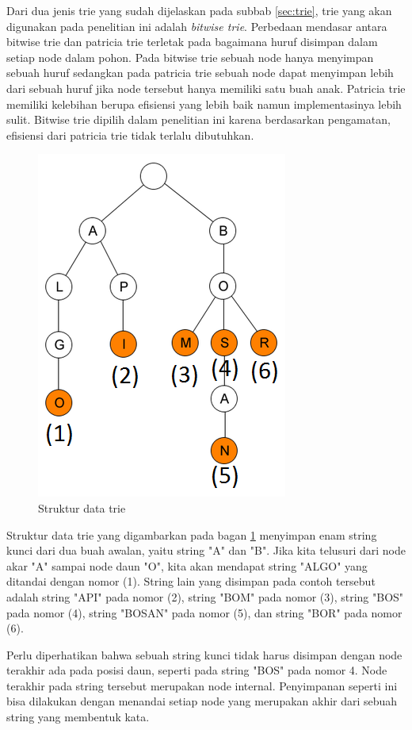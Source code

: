 Dari dua jenis trie yang sudah dijelaskan pada subbab \ref{sec:trie}, trie yang akan digunakan pada penelitian ini adalah \textit{bitwise trie}. Perbedaan mendasar antara bitwise trie dan patricia trie terletak pada bagaimana huruf disimpan dalam setiap node dalam pohon. Pada bitwise trie sebuah node hanya menyimpan sebuah huruf sedangkan pada patricia trie sebuah node dapat menyimpan lebih dari sebuah huruf jika node tersebut hanya memiliki satu buah anak. Patricia trie memiliki kelebihan berupa efisiensi yang lebih baik namun implementasinya lebih sulit. Bitwise trie dipilih dalam penelitian ini karena berdasarkan pengamatan, efisiensi dari patricia trie tidak terlalu dibutuhkan.

\begin{figure}[H]
\centering
\includegraphics[scale=0.75]{Gambar/gambar-trie}
\caption[Struktur data trie]{Struktur data trie} 
\label{bagan-trie}
\end{figure}

Struktur data trie yang digambarkan pada bagan \ref{bagan-trie} menyimpan enam string kunci dari dua buah awalan, yaitu string "A" dan "B". Jika kita telusuri dari node akar "A" sampai node daun "O", kita akan mendapat string "ALGO" yang ditandai dengan nomor (1). String lain yang disimpan pada contoh tersebut adalah string "API" pada nomor (2), string "BOM" pada nomor (3), string "BOS" pada nomor (4), string "BOSAN" pada nomor (5), dan string "BOR" pada nomor (6).

Perlu diperhatikan bahwa sebuah string kunci tidak harus disimpan dengan node terakhir ada pada posisi daun, seperti pada string "BOS" pada nomor 4. Node terakhir pada string tersebut merupakan node internal. Penyimpanan seperti ini bisa dilakukan dengan menandai setiap node yang merupakan akhir dari sebuah string yang membentuk kata.

